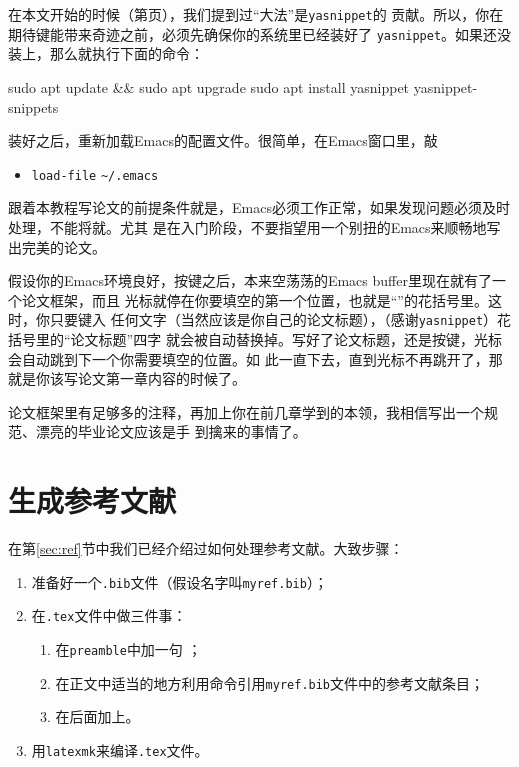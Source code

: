 在本文开始的时候（第\pageref{p:yasnippet}页），我们提到过“{\LKeyTab}大法”是\texttt{yasnippet}的
贡献。所以，你在期待\LKeyTab{}键能带来奇迹之前，必须先确保你的系统里已经装好了
\texttt{yasnippet}。如果还没装上，那么就执行下面的命令\cite{aptitude}：

\begin{codeblock}
  \begin{shcode}
sudo apt update && sudo apt upgrade
sudo apt install yasnippet yasnippet-snippets
  \end{shcode}
\end{codeblock}

装好之后，重新加载Emacs的配置文件。很简单，在Emacs窗口里，敲

\begin{itemize}
\item[]  \texttt{load-file}  \verb'~/.emacs' 
\end{itemize}

跟着本教程写论文的前提条件就是，Emacs必须工作正常，如果发现问题必须及时处理，不能将就。尤其
是在入门阶段，不要指望用一个别扭的Emacs来顺畅地写出完美的论文。

假设你的Emacs环境良好，按{\LKeyTab}键之后，本来空荡荡的Emacs buffer里现在就有了一个论文框架，而且
光标就停在你要填空的第一个位置，也就是“”的花括号里。这时，你只要键入
任何文字（当然应该是你自己的论文标题），（感谢\texttt{yasnippet}）花括号里的“论文标题”四字
就会被自动替换掉。写好了论文标题，还是按{\LKeyTab}键，光标会自动跳到下一个你需要填空的位置。如
此一直{\LKeyTab}下去，直到光标不再跳开了，那就是你该写论文第一章内容的时候了。

论文框架里有足够多的注释，再加上你在前几章学到的本领，我相信写出一个规范、漂亮的毕业论文应该是手
到擒来的事情了。

\section{生成参考文献}

在第\ref{sec:ref}节中我们已经介绍过如何处理参考文献。大致步骤：
\begin{enumerate}
\item 准备好一个\texttt{.bib}文件（假设名字叫\texttt{myref.bib}）；
\item 在\texttt{.tex}文件中做三件事：
  \begin{enumerate}
  \item 在\texttt{preamble}中加一句 \ltx{}；
  \item 在正文中适当的地方利用\ltx{\cite{}}命令引用\texttt{myref.bib}文件中的参考文献条目；
  \item 在\ltx{\appendix}后面加上\ltx{\makebib}。
  \end{enumerate}
\item 用\texttt{latexmk}来编译\texttt{.tex}文件。
\end{enumerate}

